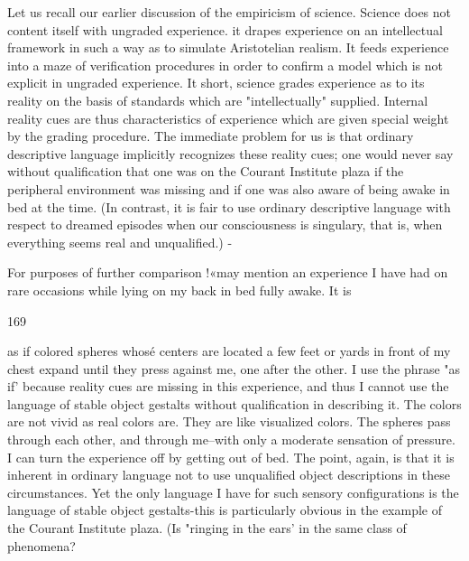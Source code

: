 \documentclass[10pt,twoside]{memoir}
\begin{document}
\begin{enumerate}
{\begin{enumerate}
\begin{sysrules}
\begin{sysrules}
\begin{sysrules}
\begin{sysrules}
{\begin{enumerate}
{{{{{{{Let us recall our earlier discussion of the empiricism of science. Science 
does not content itself with ungraded experience. it drapes experience on an 
intellectual framework in such a way as to simulate Aristotelian realism. It 
feeds experience into a maze of verification procedures in order to confirm a 
model which is not explicit in ungraded experience. It short, science grades 
experience as to its reality on the basis of standards which are 
"intellectually" supplied. Internal reality cues are thus characteristics of 
experience which are given special weight by the grading procedure. The 
immediate problem for us is that ordinary descriptive language implicitly 
recognizes these reality cues; one would never say without qualification that 
one was on the Courant Institute plaza if the peripheral environment was 
missing and if one was also aware of being awake in bed at the time. (In 
contrast, it is fair to use ordinary descriptive language with respect to 
dreamed episodes when our consciousness is singulary, that is, when 
everything seems real and unqualified.) - 

For purposes of further comparison !«may mention an experience I 
have had on rare occasions while lying on my back in bed fully awake. It is 


169 


as if colored spheres whosé centers are located a few feet or yards in front of 
my chest expand until they press against me, one after the other. I use the 
phrase "as if' because reality cues are missing in this experience, and thus I 
cannot use the language of stable object gestalts without qualification in 
describing it. The colors are not vivid as real colors are. They are like 
visualized colors. The spheres pass through each other, and through me--with 
only a moderate sensation of pressure. I can turn the experience off by 
getting out of bed. The point, again, is that it is inherent in ordinary 
language not to use unqualified object descriptions in these circumstances. 
Yet the only language I have for such sensory configurations is the language 
of stable object gestalts-this is particularly obvious in the example of the 
Courant Institute plaza. (Is "ringing in the ears' in the same class of 
phenomena? } 

}}}}}}
\end{enumerate}}
\end{sysrules}
\end{sysrules}
\end{sysrules}
\end{sysrules}
\end{enumerate}}
\end{enumerate}
\end{document}
